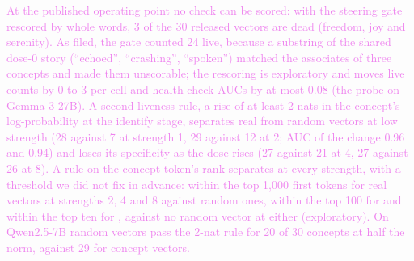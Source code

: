 \documentclass[11pt,a4paper]{article}
\newcommand{\draft}[1]{\textcolor{violet}{#1}}
\begin{document}
\draft{At the published operating point no check can be scored: with the steering gate rescored
by whole words, 3 of the 30 released vectors are dead (freedom, joy and serenity). As filed, the
gate counted 24 live, because a substring of the shared dose-0 story (``echoed'', ``crashing'',
``spoken'') matched the associates of three concepts and made them unscorable; the rescoring is
exploratory and moves live counts by 0 to 3 per cell and health-check AUCs by at most 0.08 (the
probe on Gemma-3-27B). A second
liveness rule, a rise of at least 2 nats in the concept's log-probability at the identify stage,
separates real from random vectors at low strength (28 against 7 at strength 1, 29 against 12 at
2; AUC of the change 0.96 and 0.94) and loses its specificity as the dose rises (27 against 21 at
4, 27 against 26 at 8). A rule on the concept token's rank separates at every strength, with a
threshold we did not fix in advance: within the top 1,000 first tokens for \idTopThousandReal{} real
vectors at strengths 2, 4 and 8 against \idTopThousandRandom{} random ones, within the top 100 for
\idTopHundredReal{} and within the top ten for \idTopTenReal{}, against no random vector at either
(exploratory). On Qwen2.5-7B random vectors pass the 2-nat
rule for 20 of 30 concepts at half the norm, against 29 for concept vectors.}

\begin{table}[t]
\centering
\small
\resizebox{\textwidth}{!}{}
\caption{\draft{Live vectors per recipe at each session's gate dose (steered at the gate, not at
dose 0), and the released recipe at its released strength, as filed (substring matching);
Table~\ref{tab:regimes} gives the counts with the gate rescored by whole word.}}
\label{tab:liveness}
\end{table}

\begin{table}[t]
\centering
\resizebox{\textwidth}{!}{}
\caption{\draft{AUC of each health check at telling live from dead vectors, pooled across recipes,
with stratified bootstrap intervals (none stored for Gemma-3-12B's own checks). Logit-lens accessibility was
filed before analysis but after the liveness labels were known.}}
\label{tab:health}
\end{table}

\begin{table}[t]
\centering
\resizebox{\textwidth}{!}{}
\caption{\draft{Health-check AUCs within one recipe, concrete concepts only (20 vectors per cell;
read as direction, not as tests). Exploratory.}}
\label{tab:cells}
\end{table}
\end{document}
